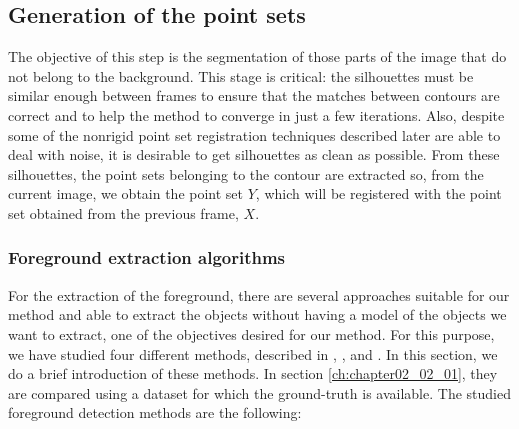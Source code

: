 \subsection{Generation of the point sets}\label{ch:chapter02_01_01}

The objective of this step is the segmentation of those parts of the image that do not belong to the background. This stage is critical: the silhouettes must be similar enough between frames to ensure that the matches between contours are correct and to help the method to converge in just a few iterations. Also, despite some of the nonrigid point set registration techniques described later are able to deal with noise, it is desirable to get silhouettes as clean as possible. From these silhouettes, the point sets belonging to the contour are extracted so, from the current image, we obtain the point set $Y$, which will be registered with the point set obtained from the previous frame, $X$.

\subsubsection{Foreground extraction algorithms}\label{ch:chapter02_01_01_01}

For the extraction of the foreground, there are several approaches suitable for our method and able to extract the objects without having a model of the objects we want to extract, one of the objectives desired for our method. For this purpose, we have studied four different methods, described in \cite{lopez2011stochastic}, \cite{lopez2011foreground}, \cite{guo2011hierarchical} and \cite{reddy2012improved}. In this section, we do a brief introduction of these methods. In section \ref{ch:chapter02_02_01}, they are compared using a dataset for which the ground-truth is available.
The studied foreground detection methods are the following:

